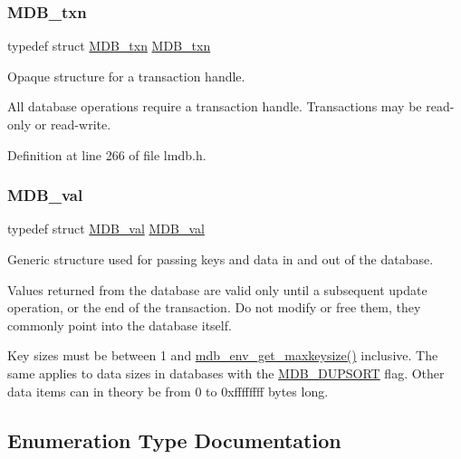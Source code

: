 \subsubsection{\texorpdfstring{M\+D\+B\+\_\+txn}{MDB\_txn}}
{\footnotesize\ttfamily typedef struct \mbox{\hyperlink{struct_m_d_b__txn}{M\+D\+B\+\_\+txn}} \mbox{\hyperlink{struct_m_d_b__txn}{M\+D\+B\+\_\+txn}}}



Opaque structure for a transaction handle. 

All database operations require a transaction handle. Transactions may be read-\/only or read-\/write. 

Definition at line 266 of file lmdb.\+h.

\mbox{\label{group__mdb_gadbf837292dc74689b20df5937fddc96c}} 
\subsubsection{\texorpdfstring{M\+D\+B\+\_\+val}{MDB\_val}}
{\footnotesize\ttfamily typedef struct \mbox{\hyperlink{struct_m_d_b__val}{M\+D\+B\+\_\+val}}  \mbox{\hyperlink{struct_m_d_b__val}{M\+D\+B\+\_\+val}}}



Generic structure used for passing keys and data in and out of the database. 

Values returned from the database are valid only until a subsequent update operation, or the end of the transaction. Do not modify or free them, they commonly point into the database itself.

Key sizes must be between 1 and \mbox{\hyperlink{group__mdb_gaaf0be004f33828bf2fb09d77eb3cef94}{mdb\+\_\+env\+\_\+get\+\_\+maxkeysize()}} inclusive. The same applies to data sizes in databases with the \mbox{\hyperlink{group__mdb__dbi__open_gae0626566c2562e9007f5c8c9535bab1a}{M\+D\+B\+\_\+\+D\+U\+P\+S\+O\+RT}} flag. Other data items can in theory be from 0 to 0xffffffff bytes long. 

\subsection{Enumeration Type Documentation}
\mbox{\label{group__mdb_ga1206b2af8b95e7f6b0ef6b28708c9127}} 
